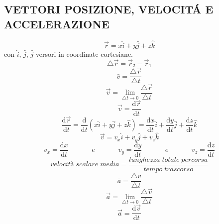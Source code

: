 \documentclass{article}
\newcommand\mathspace{\;\;\;\;\;\;\;\;\;\;\;\; e \;\;\;\;\;\;\;\;\;\;\;\;}
\begin{document}
		\subsection{VETTORI POSIZIONE, VELOCIT\'A E ACCELERAZIONE}
			\begin{equation} \vec r = x \hat{i} + y \hat{j} + z \hat{k} \end{equation}
			con $\hat{i}$, $\hat{j}$, $\hat{j}$ versori in coordinate cortesiane.
			\begin{equation} \triangle \vec{r} = \vec r_2 - \vec r_1 \end{equation}
			\begin{equation} \bar v = \frac{ \triangle \vec r }{ \triangle t } \end{equation}
			\begin{equation} \vec v = \lim_{ \triangle t \to 0} \frac{ \triangle \vec r }{ \triangle t } \end{equation}
			\begin{equation} \vec v = \frac{ \mathrm d \vec r }{ \mathrm d t } \end{equation}
			\begin{equation}
				\frac{ \mathrm d \vec r }{ \mathrm d t } = \frac{ \mathrm d }{ \mathrm d t} ( x \hat i + y \hat j + z \hat k ) =
				\frac{ \mathrm d x }{ \mathrm d t } \hat i + \frac{ \mathrm d y }{ \mathrm d t } \hat j + \frac{ \mathrm d z }{ \mathrm d t } \hat k
			\end{equation}
			\begin{equation} \vec v = v_x \hat i + v_y \hat j + v_z \hat k \end{equation}
			\begin{equation}
				v_x = \frac{ \mathrm d x }{ \mathrm d t } \mathspace
				v_y = \frac{ \mathrm d y }{ \mathrm d t } \mathspace
				v_z = \frac{ \mathrm d z }{ \mathrm d t }
			\end{equation}
			\begin{equation} velocit\textit{à} \; scalare \; media = \frac{ lunghezza \; totale \; percorsa }{ tempo \; trascorso } \end{equation}
			\begin{equation} \bar a = \frac{ \triangle v }{ \triangle t } \end{equation}
			\begin{equation} \vec a = \lim_{ \triangle t \to 0 } \frac{ \triangle \vec v }{ \triangle t } \end{equation}
			\begin{equation} \vec a = \frac{ \mathrm d \vec v }{ \mathrm d t } \end{equation}
\end{document}
